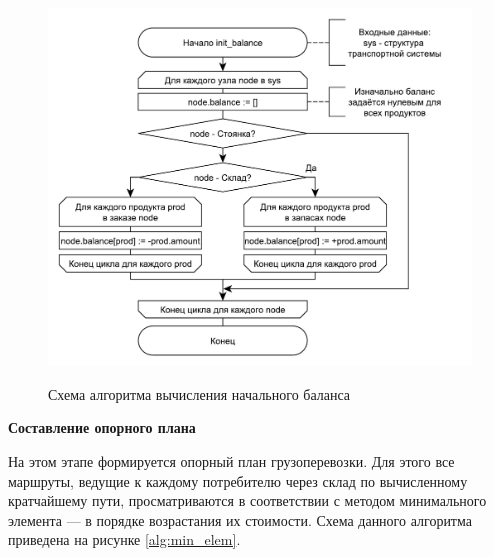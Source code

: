 \pagebreak
\begin{figure}[h]
	\begin{center}
		{\includegraphics[scale=0.7, angle=0, page=1]{img/init_balance.pdf}}
		\caption{Схема алгоритма вычисления начального баланса}
		\label{alg:balance}
	\end{center}
\end{figure}

\textbf{Составление опорного плана}

На этом этапе формируется опорный план грузоперевозки. Для этого все маршруты, ведущие к каждому потребителю через склад по вычисленному \, кратчайшему пути, просматриваются в соответствии с методом минимального элемента --- в порядке возрастания их стоимости. Схема данного алгоритма приведена на рисунке \ref{alg:min_elem}.

